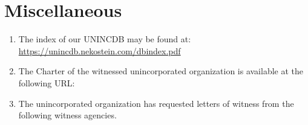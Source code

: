 \section{Miscellaneous}
\begin{enumerate}
    \tightlist
    \item The index of our UNINCDB may be found at:\\
        \href{https://unincdb.nekostein.com/dbindex.pdf}{https://unincdb.nekostein.com/dbindex.pdf}
    \item The Charter of the witnessed unincorporated organization is available at the following URL:\\
        
    \item The unincorporated organization has requested letters of witness from the following witness agencies.
    \begin{itemize}
        
    \end{itemize}
\end{enumerate}

\hsepline








